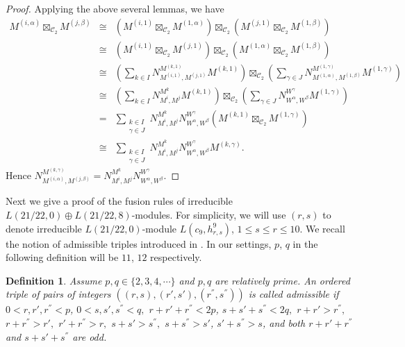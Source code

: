 \documentclass{article}
\newtheorem{definition}[lemma]{Definition}
\def\CC{{\mathcal{C}}}
\begin{document}
\begin{proof}
	Applying the above several lemmas, we have
	\begin{eqnarray*}
		M^{(i,\alpha)}\boxtimes_{ \CC_2}M^{(j,\beta)} &\cong&(M^{(i,1)}\boxtimes_{ \CC_2}M^{(1,\alpha)})
		\boxtimes_{ \CC_2}(M^{(j,1)}\boxtimes_{ \CC_2}M^{(1,\beta)})\\
		&\cong&(M^{(i,1)}\boxtimes_{ \CC_2}M^{(j,1)})
		\boxtimes_{ \CC_2}(M^{(1,\alpha)}\boxtimes_{ \CC_2}M^{(1,\beta)})\\
		&\cong&\left(\sum_{k\in I}N_{ M^{(i,1)},M^{(j,1)}}^{M^{(k,1)}}M^{(k, 1)}\right)\boxtimes_{ \CC_2}
		\left(\sum_{\gamma\in J}N_{ M^{(1,\alpha)},M^{(1, \beta)}}^{M^{(1, \gamma)}}M^{(1,\gamma)}\right)\\
		&\cong&\left(\sum_{k\in I}N_{M^i,M^j}^{M^k}M^{(k, 1)}\right)\boxtimes_{ \CC_2}
		\left(\sum_{\gamma\in J}N_{W^{\alpha},W^{\beta}}^{W^{\gamma}}M^{(1,\gamma)}\right)\\
		& =&\sum_{\substack{k\in I \\ \gamma \in J}}N_{M^i,M^j}^{M^k} N_{W^{\alpha},W^{\beta}}^{W^{\gamma}}\left(M^{(k, 1)}\boxtimes_{ \CC_2}M^{(1,\gamma)}\right)\\
		&\cong&\sum_{\substack{k\in I \\ \gamma \in J}}N_{M^i,M^j}^{M^k} N_{W^{\alpha},W^{\beta}}^{W^{\gamma}}M^{(k,\gamma)}.
	\end{eqnarray*}
	Hence $N_{M^{(i,\alpha)},M^{(j,\beta)}}^{M^{(k,\gamma)}}=N_{M^i,M^j}^{M^k} N_{W^{\alpha},W^{\beta}}^{W^{\gamma}}.$
\end{proof}

Next we give a proof of the fusion rules of irreducible $L(21/22,0)\oplus L(21/22, 8)$-modules. For simplicity, we will use $(r, s)$ to denote irreducible $L(21/22,0)$-module $L(c_9, h_{r,s}^9)$, $1 \le s \le r \le 10$. We recall the notion of admissible triples introduced in \cite{W}. In our settings, $p$, $q$ in the following definition will be $11$, $12$ respectively.
\begin{definition}
	Assume $p, q\in \{2, 3, 4, \cdots\}$ and $p, q $ are relatively prime. An ordered triple of pairs of integers $((r,s), (r',s'), (r^{''}, s^{''}))$  is called admissible if $0<r,r',r^{''}<p$, $0<s,s',s^{''}<q,$ $r+r'+r^{''}<2p$, $s+s'+s^{''}<2q,$ $r+r'>r^{''},$ $r+r^{''}>r',$ $r'+r^{''}>r,$ $s+s'>s^{''},$ $s+s^{''}>s'$, $s'+s^{''}>s$, and both $r+r'+r^{''}$ and $s+s'+s^{''}$ are odd.
\end{definition}
\end{document}
